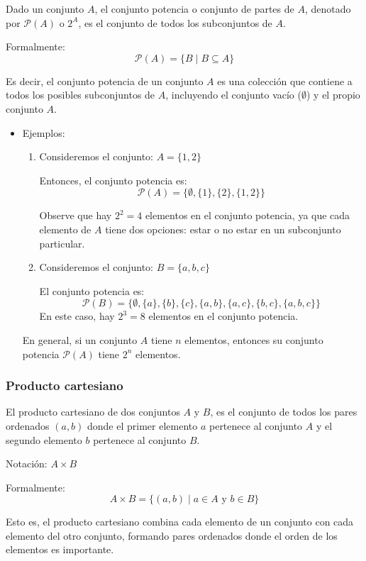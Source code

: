 \begin{fmd-definition}
	Dado un conjunto \(A\), el conjunto potencia o conjunto de partes de \(A\), denotado por \(\mathcal{P}(A)\) o \(2^A\), es el conjunto de todos los subconjuntos de \(A\). 
	
	Formalmente:
	$$\mathcal{P}(A) = \{B \mid B \subseteq A\}$$
	
	Es decir, el conjunto potencia de un conjunto \(A\) es una colección que contiene a todos los posibles subconjuntos de \(A\), incluyendo el conjunto vacío (\(\emptyset\)) y el propio conjunto \(A\).
\end{fmd-definition}

\begin{itemize}
	\item Ejemplos:
	
	\begin{enumerate}
		\item Consideremos el conjunto: \(A = \{1, 2\}\)
		
		Entonces, el conjunto potencia es:
		$$\mathcal{P}(A) = \{\emptyset, \{1\}, \{2\}, \{1, 2\}\}$$
		
		Observe que hay \(2^2 = 4\) elementos en el conjunto potencia, ya que cada elemento de \(A\) tiene dos opciones: estar o no estar en un subconjunto particular.
		
		\item Consideremos el conjunto: \(B = \{a, b, c\}\)
		
		El conjunto potencia es:
		$$\mathcal{P}(B) = \{\emptyset, \{a\}, \{b\}, \{c\}, \{a, b\}, \{a, c\}, \{b, c\}, \{a, b, c\}\}$$
		En este caso, hay \(2^3 = 8\) elementos en el conjunto potencia.
	\end{enumerate}
	
	En general, si un conjunto \(A\) tiene \(n\) elementos, entonces su conjunto potencia \(\mathcal{P}(A)\) tiene \(2^n\) elementos.
\end{itemize}

\subsubsection{Producto cartesiano}
\vspace{1em}

\begin{fmd-definition}
	El producto cartesiano de dos conjuntos \(A\) y \(B\), es el conjunto de todos los pares ordenados \((a, b)\) donde el primer elemento \(a\) pertenece al conjunto \(A\) y el segundo elemento \(b\) pertenece al conjunto \(B\).

	Notación: \(A \times B\)
	
	Formalmente:
	$$A \times B = \{(a, b) \mid a \in A \text{ y } b \in B\}$$
	
	Esto es, el producto cartesiano combina cada elemento de un conjunto con cada elemento del otro conjunto, formando pares ordenados donde el orden de los elementos es importante.
\end{fmd-definition}

